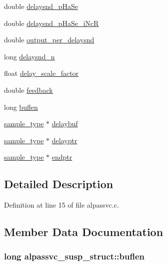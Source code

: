 \begin{DoxyCompactItemize}
double \hyperlink{structalpassvc__susp__struct_a9940a036feb84ba5870143e8f9fd40b2}{delaysnd\+\_\+p\+Ha\+Se}
\item 
double \hyperlink{structalpassvc__susp__struct_a76f7235fba6c2bc4552f961440e3852d}{delaysnd\+\_\+p\+Ha\+Se\+\_\+i\+NcR}
\item 
double \hyperlink{structalpassvc__susp__struct_a16013c5e08f12043c9145d65848420ef}{output\+\_\+per\+\_\+delaysnd}
\item 
long \hyperlink{structalpassvc__susp__struct_aa20301b455dd292d6c697488afeb1ff5}{delaysnd\+\_\+n}
\item 
float \hyperlink{structalpassvc__susp__struct_aa5abb814892d4d2bf1b6bce3ed886011}{delay\+\_\+scale\+\_\+factor}
\item 
double \hyperlink{structalpassvc__susp__struct_a294289fc3fd4d90aebae21ff51375e2b}{feedback}
\item 
long \hyperlink{structalpassvc__susp__struct_abee812b01f6e98124e20aa34ad70dee6}{buflen}
\item 
\hyperlink{sound_8h_a3a9d1d4a1c153390d2401a6e9f71b32c}{sample\+\_\+type} $\ast$ \hyperlink{structalpassvc__susp__struct_a073980ec0f775d6756f35b8bcc85b265}{delaybuf}
\item 
\hyperlink{sound_8h_a3a9d1d4a1c153390d2401a6e9f71b32c}{sample\+\_\+type} $\ast$ \hyperlink{structalpassvc__susp__struct_a98714f8a8ba703fad19257e3c1347dd0}{delayptr}
\item 
\hyperlink{sound_8h_a3a9d1d4a1c153390d2401a6e9f71b32c}{sample\+\_\+type} $\ast$ \hyperlink{structalpassvc__susp__struct_a71c5cccc58d0908a8fd9eb3d541f153f}{endptr}
\end{DoxyCompactItemize}


\subsection{Detailed Description}


Definition at line 15 of file alpassvc.\+c.



\subsection{Member Data Documentation}
\subsubsection[{\texorpdfstring{buflen}{buflen}}]{\setlength{\rightskip}{0pt plus 5cm}long alpassvc\+\_\+susp\+\_\+struct\+::buflen}\hypertarget{structalpassvc__susp__struct_abee812b01f6e98124e20aa34ad70dee6}{}\label{structalpassvc__susp__struct_abee812b01f6e98124e20aa34ad70dee6}


